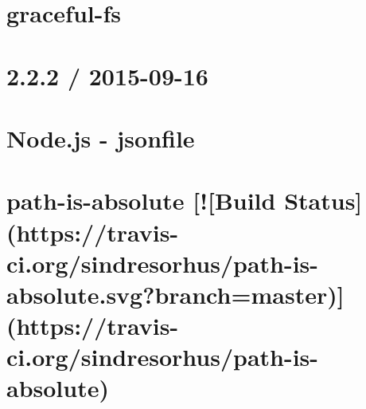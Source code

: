 \documentclass[twoside]{book}
\newcommand{\+}{\discretionary{\mbox{\scriptsize$\hookleftarrow$}}{}{}}
\begin{document}
\chapter{graceful-\/fs}
\label{md__c_1__users_martin__documents__git_hub_visual_studio__bachelor__wis_r__wis_r_node_modules_gruafdf9226a0516c61d769c7ed33815946}
\hypertarget{md__c_1__users_martin__documents__git_hub_visual_studio__bachelor__wis_r__wis_r_node_modules_gruafdf9226a0516c61d769c7ed33815946}{}

\chapter{2.2.2 / 2015-\/09-\/16}
\label{md__c_1__users_martin__documents__git_hub_visual_studio__bachelor__wis_r__wis_r_node_modules_gru09fdf7888bf6f41d2ef83874589f8164}
\hypertarget{md__c_1__users_martin__documents__git_hub_visual_studio__bachelor__wis_r__wis_r_node_modules_gru09fdf7888bf6f41d2ef83874589f8164}{}

\chapter{Node.\+js -\/ jsonfile}
\label{md__c_1__users_martin__documents__git_hub_visual_studio__bachelor__wis_r__wis_r_node_modules_gru7205ba21379ae31219c53c1142bb3934}
\hypertarget{md__c_1__users_martin__documents__git_hub_visual_studio__bachelor__wis_r__wis_r_node_modules_gru7205ba21379ae31219c53c1142bb3934}{}

\chapter{path-\/is-\/absolute \mbox{[}!\mbox{[}Build Status\mbox{]}(https\+://travis-\/ci.org/sindresorhus/path-\/is-\/absolute.svg?branch=master)\mbox{]}(https\+://travis-\/ci.org/sindresorhus/path-\/is-\/absolute)}
\label{md__c_1__users_martin__documents__git_hub_visual_studio__bachelor__wis_r__wis_r_node_modules_gru96d5ce91892b3ac628fa7c1cb6d08516}
\hypertarget{md__c_1__users_martin__documents__git_hub_visual_studio__bachelor__wis_r__wis_r_node_modules_gru96d5ce91892b3ac628fa7c1cb6d08516}{}

\end{document}
